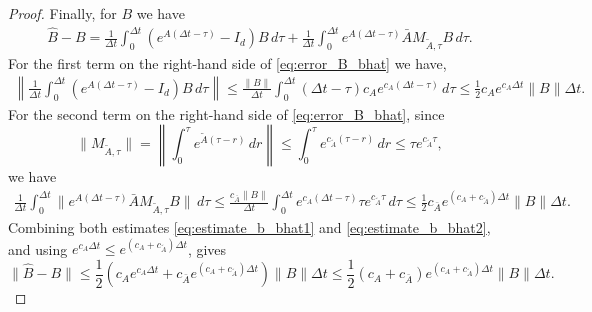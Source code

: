 \documentclass[10pt,a4paper]{amsart}
\begin{document}
\begin{proof}
Finally, for $B$ we have
\begin{align}\label{eq:error_B_bhat}
        \hat B-B
    =
    \frac1{\Delta t}\int_0^{\Delta t}
    (e^{A(\Delta t-\tau)}-I_d)B\,d\tau
    +
    \frac1{\Delta t}\int_0^{\Delta t}
    e^{A(\Delta t-\tau)}\bar A M_{\tilde A,\tau}B\,d\tau.
\end{align}
For the first term on the right-hand side of \eqref{eq:error_B_bhat} we have,
\begin{align}\label{eq:estimate_b_bhat1}
     \left\|
    \frac1{\Delta t}\int_0^{\Delta t}
    (e^{A(\Delta t-\tau)}-I_d)B\,d\tau
    \right\|
    \le
    \frac{\|B\|}{\Delta t}\int_0^{\Delta t}
    (\Delta t-\tau)c_Ae^{c_A(\Delta t-\tau)}\,d\tau
    \le
    \frac12 c_A e^{c_A\Delta t}\|B\|\Delta t.
\end{align}
For the second term on the right-hand side of \eqref{eq:error_B_bhat}, since
\[
    \|M_{\tilde A,\tau}\|
    =
    \left\|
        \int_0^\tau e^{\tilde A(\tau-r)}\,dr
    \right\|
    \le
    \int_0^\tau e^{c_{\tilde A}(\tau-r)}\,dr
    \le
    \tau e^{c_{\tilde A}\tau},
\]
we have
\begin{align}\label{eq:estimate_b_bhat2}
    \frac1{\Delta t}\int_0^{\Delta t}
    \|e^{A(\Delta t-\tau)}\bar A M_{\tilde A,\tau}B\|\,d\tau
    \le
    \frac{c_{\bar A}\|B\|}{\Delta t}
    \int_0^{\Delta t}
    e^{c_A(\Delta t-\tau)}\tau e^{c_{\tilde A}\tau}\,d\tau
    \le
    \frac12 c_{\bar A}e^{(c_A+c_{\tilde A})\Delta t}\|B\|\Delta t.
\end{align}
Combining both estimates \eqref{eq:estimate_b_bhat1} and \eqref{eq:estimate_b_bhat2}, and using $e^{c_A\Delta t}\le e^{(c_A+c_{\tilde A})\Delta t}$, gives
\[
    \|\hat B-B\|
    \le
    \frac12
    \left(
        c_A e^{c_A\Delta t}
        +
        c_{\bar A}e^{(c_A+c_{\tilde A})\Delta t}
    \right)
    \|B\|\Delta t\leq \frac12
    (c_A+c_{\bar A})e^{(c_A+c_{\tilde A})\Delta t}
    \|B\|\Delta t.
\]
\end{proof}
\end{document}
